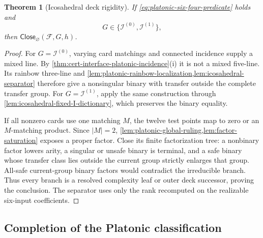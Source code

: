 \documentclass[11pt,letterpaper,onecolumn]{article}
\theoremstyle{plain}
\newtheorem{theorem}{Theorem}[section]
\theoremstyle{definition}
\theoremstyle{remark}
\newcommand{\cF}{\mathcal F}
\newcommand{\IcoZero}{{\mathcal I^{(0)}}}
\newcommand{\IcoOne}{{\mathcal I^{(1)}}}
\newcommand{\Close}{\mathsf{Close}}
\begin{document}
\begin{theorem}[Icosahedral deck rigidity]
\label{thm:icosahedral-deck-rigidity}
If \cref{eq:platonic-six-four-predicate} holds and
\[
 G\in\{\IcoZero,\IcoOne\},
\]
then \(\Close_{\varnothing}(\cF,G,h)\).
\end{theorem}

\begin{proof}
For \(G=\IcoZero\), varying card matchings and connected incidence
supply a mixed line. By
\cref{thm:cert-interface-platonic-incidence}\textnormal{(i)} it is not a
mixed five-line. Its rainbow three-line and
\cref{lem:platonic-rainbow-localization,lem:icosahedral-separator}
therefore give a nonsingular binary with transfer outside the complete
transfer group. For \(G=\IcoOne\), apply the same construction through
\cref{lem:icosahedral-fixed-I-dictionary}, which preserves the binary equality.

If all nonzero cards use one matching \(M\), the twelve test points map
to zero or an \(M\)-matching product. Since \(|M|=2\),
\cref{lem:platonic-global-ruling,lem:factor-saturation} exposes a proper
factor. Close its finite factorization tree: a nonbinary factor lowers arity, a
singular or unsafe binary is terminal, and a safe binary whose
transfer class lies outside the current group strictly enlarges that group.
All-safe current-group binary
factors would contradict the irreducible branch.  Thus every branch is a
resolved complexity leaf or outer deck successor, proving the conclusion.  The separator uses only the rank recomputed on
the realizable six-input coefficients.
\end{proof}

\subsection{Completion of the Platonic classification}
\end{document}
